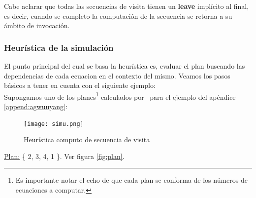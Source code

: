 Cabe aclarar que todas las secuencias de visita tienen un \textbf{leave} implícito al final, es decir, cuando se completo la computación de la secuencia se retorna a su ámbito de invocación.

\subsubsection*{Heurística de la simulación}
El punto principal del cual se basa la heurística es, evaluar el plan buscando las dependencias de cada ecuacion en el contexto del mismo. Veamos los pasos básicos a tener en cuenta con el siguiente ejemplo:\\
Supongamos uno de los planes\footnote{Es importante notar el echo de que cada plan se conforma de los números de ecuaciones a computar.} calculados por \maggen\ para el ejemplo del apéndice \ref{append:agwuuyang}:\\
\begin{figure}\centering
\texttt{[image: simu.png]}
\caption{\label{fig:simul}Heurística computo de secuencia de visita}
\end{figure}
\underline{Plan:} \{ 2, 3, 4, 1 \}. Ver figura \ref{fig:plan}.

